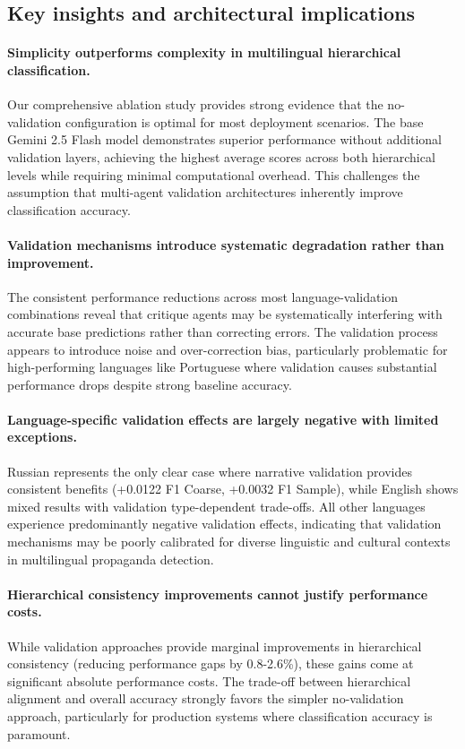 \subsection{Key insights and architectural implications}

\paragraph{Simplicity outperforms complexity in multilingual hierarchical classification.} Our comprehensive ablation study provides strong evidence that the no-validation configuration is optimal for most deployment scenarios. The base Gemini 2.5 Flash model demonstrates superior performance without additional validation layers, achieving the highest average scores across both hierarchical levels while requiring minimal computational overhead. This challenges the assumption that multi-agent validation architectures inherently improve classification accuracy.

\paragraph{Validation mechanisms introduce systematic degradation rather than improvement.} The consistent performance reductions across most language-validation combinations reveal that critique agents may be systematically interfering with accurate base predictions rather than correcting errors. The validation process appears to introduce noise and over-correction bias, particularly problematic for high-performing languages like Portuguese where validation causes substantial performance drops despite strong baseline accuracy.

\paragraph{Language-specific validation effects are largely negative with limited exceptions.} Russian represents the only clear case where narrative validation provides consistent benefits (+0.0122 F1 Coarse, +0.0032 F1 Sample), while English shows mixed results with validation type-dependent trade-offs. All other languages experience predominantly negative validation effects, indicating that validation mechanisms may be poorly calibrated for diverse linguistic and cultural contexts in multilingual propaganda detection.

\paragraph{Hierarchical consistency improvements cannot justify performance costs.} While validation approaches provide marginal improvements in hierarchical consistency (reducing performance gaps by 0.8-2.6\%), these gains come at significant absolute performance costs. The trade-off between hierarchical alignment and overall accuracy strongly favors the simpler no-validation approach, particularly for production systems where classification accuracy is paramount.

